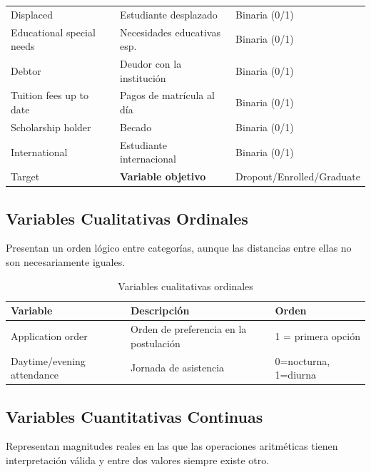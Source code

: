 \documentclass[11pt,a4paper]{article}
\begin{document}
\begin{longtable}{p{6.5cm} p{4.5cm} p{3.5cm}}
  Displaced                 & Estudiante desplazado         & Binaria (0/1) \\
  Educational special needs & Necesidades educativas esp.   & Binaria (0/1) \\
  Debtor                    & Deudor con la institución     & Binaria (0/1) \\
  Tuition fees up to date   & Pagos de matrícula al día     & Binaria (0/1) \\
  Scholarship holder        & Becado                        & Binaria (0/1) \\
  International             & Estudiante internacional      & Binaria (0/1) \\
  Target                    & \textbf{Variable objetivo}    & Dropout/Enrolled/Graduate \\
\end{longtable}

\subsection{Variables Cualitativas Ordinales}

Presentan un orden lógico entre categorías, aunque las distancias entre ellas no son
necesariamente iguales.

\begin{table}[H]
  \centering
  \begin{tabular}{p{6cm} p{5cm} p{3cm}}
    \toprule
    \textbf{Variable} & \textbf{Descripción} & \textbf{Orden} \\
    \midrule
    Application order    & Orden de preferencia en la postulación & 1 = primera opción \\
    Daytime/evening attendance & Jornada de asistencia & 0=nocturna, 1=diurna \\
    \bottomrule
  \end{tabular}
  \caption{Variables cualitativas ordinales}
\end{table}

\subsection{Variables Cuantitativas Continuas}

Representan magnitudes reales en las que las operaciones aritméticas tienen interpretación
válida y entre dos valores siempre existe otro.
\end{document}
